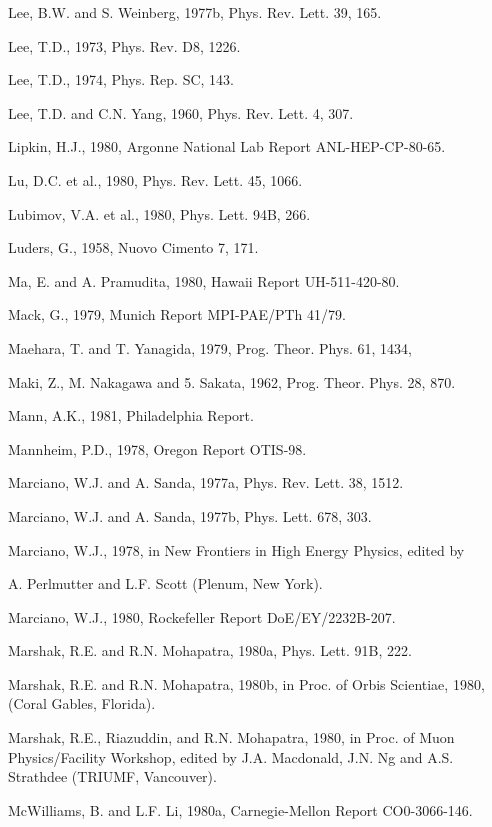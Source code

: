 \documentclass[twoside]{article}
\begin{document}
{{{{{{{{{{{{{{{{\begin{thebibliography}{10}
\bibitem{}
Lee, B.W. and S. Weinberg, 1977b, Phys. Rev. Lett. 39, 165.

\bibitem{}
Lee, T.D., 1973, Phys. Rev. D8, 1226.

\bibitem{}
Lee, T.D., 1974, Phys. Rep. SC, 143.

\bibitem{}
Lee, T.D. and C.N. Yang, 1960, Phys. Rev. Lett. 4, 307.

\bibitem{}
Lipkin, H.J., 1980, Argonne National Lab Report ANL-HEP-CP-80-65.

\bibitem{}
Lu, D.C. et al., 1980, Phys. Rev. Lett. 45, 1066.

\bibitem{}
Lubimov, V.A. et al., 1980, Phys. Lett. 94B, 266.

\bibitem{}
Luders, G., 1958, Nuovo Cimento 7, 171.

\bibitem{}
Ma, E. and A. Pramudita, 1980, Hawaii Report UH-511-420-80.

\bibitem{}
Mack, G., 1979, Munich Report MPI-PAE/PTh 41/79.

\bibitem{}
Maehara, T. and T. Yanagida, 1979, Prog. Theor. Phys. 61, 1434,

\bibitem{}
Maki, Z., M. Nakagawa and 5. Sakata, 1962, Prog. Theor. Phys. 28, 870.

\bibitem{}
Mann, A.K., 1981, Philadelphia Report.

\bibitem{}
Mannheim, P.D., 1978, Oregon Report OTIS-98.

\bibitem{}
Marciano, W.J. and A. Sanda, 1977a, Phys. Rev. Lett. 38, 1512.

\bibitem{}
Marciano, W.J. and A. Sanda, 1977b, Phys. Lett. 678, 303.

\bibitem{}
Marciano, W.J., 1978, in New Frontiers in High Energy Physics, edited by

A. Perlmutter and L.F. Scott (Plenum, New York).

\bibitem{}
Marciano, W.J., 1980, Rockefeller Report DoE/EY/2232B-207.

\bibitem{}
Marshak, R.E. and R.N. Mohapatra, 1980a, Phys. Lett. 91B, 222.

\bibitem{}
Marshak, R.E. and R.N. Mohapatra, 1980b, in Proc. of Orbis Scientiae, 1980, (Coral Gables, Florida).

\bibitem{}
Marshak, R.E., Riazuddin, and R.N. Mohapatra, 1980, in Proc. of Muon Physics/Facility Workshop, edited by J.A. Macdonald, J.N. Ng and A.S. Strathdee (TRIUMF, Vancouver).

\bibitem{}
McWilliams, B. and L.F. Li, 1980a, Carnegie-Mellon Report CO0-3066-146.


\end{thebibliography}}}}}}}}}}}}}}}}}
\end{document}
